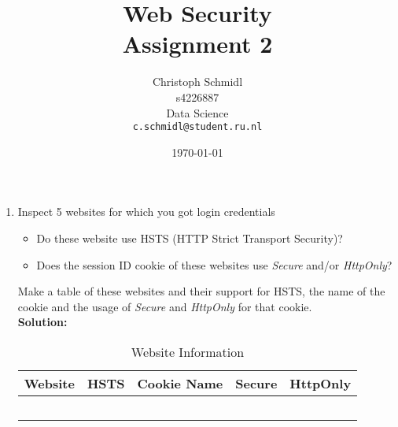 \documentclass[a4paper]{article}
\title{Web Security\\Assignment 2}
\author{
  Christoph Schmidl\\ s4226887\\ Data Science\\      \texttt{c.schmidl@student.ru.nl}
}
\date{\today}
\begin{document}
\maketitle

\begin{enumerate}


\item Inspect 5 websites for which you got login credentials
	\begin{itemize}
		\item Do these website use HSTS (HTTP Strict Transport Security)?
		\item Does the session ID cookie of these websites use \textit{Secure} and/or \textit{HttpOnly}?
	\end{itemize}

Make a table of these websites and their support for HSTS, the name of the cookie and the usage of \textit{Secure} and \textit{HttpOnly} for that cookie.\\
\textbf{Solution:}\\

\begin{table}[h!]
\centering
\label{my-label}
\begin{tabular}{|c|l|c|c|l|}
\hline
\textbf{Website} & \textbf{HSTS} & \textbf{Cookie Name}  & \textbf{Secure} & \textbf{HttpOnly} \\ \hline
                       &  &                       &                       &  \\ \hline
                       &  &                       &                       &  \\ \hline
                       &  &                       &                       &  \\ \hline
                       &  &                       &                       &  \\ \hline
\multicolumn{1}{|l|}{} &  & \multicolumn{1}{l|}{} & \multicolumn{1}{l|}{} &  \\ \hline
\end{tabular}
\caption{Website Information}
\end{table}


\end{enumerate}
\end{document}
